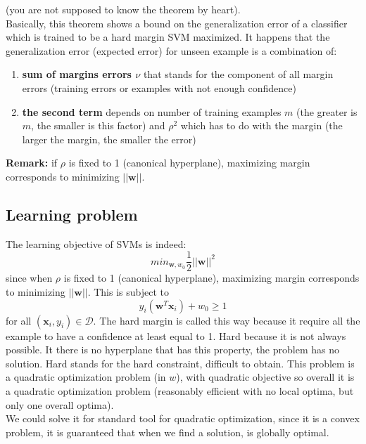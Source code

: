     (you are not supposed to know the theorem by heart).\\
    Basically, this theorem shows a bound on the generalization error of a classifier which is trained to be a hard margin SVM maximized. It happens that the generalization error (expected error) for unseen example is a combination of:
    \begin{enumerate}
        \item \textbf{sum of margins errors $\nu$} that stands for the component of all margin errors (training errors or examples with not enough confidence)
        \item \textbf{the second term} depends on number of training examples $m$ (the greater is $m$, the smaller is this factor) and $\rho^2$ which has to do with the margin (the larger the margin, the smaller the error)
    \end{enumerate}
    
    \textbf{Remark:} if $\rho$ is fixed to 1 (canonical hyperplane), maximizing margin corresponds to minimizing $||\pmb{w}||$.

    \subsection{Learning problem}
        The learning objective of SVMs is indeed: 
        \begin{equation}
            min_{\pmb{w}, w_0} \frac{1}{2} ||\pmb{w}||^2
        \end{equation}
        since when $\rho$ is fixed to 1 (canonical hyperplane), maximizing margin corresponds to minimizing $||\pmb{w}||$.
        This is subject to 
        $$y_i (\pmb{w}^T \pmb{x}_i) + w_0 \geq 1$$ 
        for all $(\pmb{x}_i, y_i) \in \mathcal{D}$. The hard margin is called this way because it require all the example to have a confidence at least equal to 1. Hard because it is not always possible. 
        It there is no hyperplane that has this property, the problem has no solution. Hard stands for the hard constraint, difficult to obtain. 
        This problem is a quadratic optimization problem (in $w$), with quadratic objective so overall it is a quadratic optimization problem (reasonably efficient with no local optima, but only one overall optima).\\
        We could solve it for standard tool for quadratic optimization, since it is a convex problem, it is guaranteed that when we find a solution, is globally optimal. 
        
